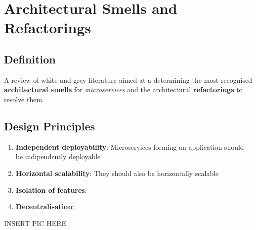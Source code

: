 \chapter{Architectural Smells and Refactorings}
\section{Definition}
A review of white and grey literature aimed at a determining the most recognised \textbf{architectural smells} for \textit{microservices} and the architectural \textbf{refactorings} to resolve them.

\section{Design Principles}
\begin{enumerate}
   \item \textbf{Independent deployability}:
   Microservices forming an application should be indipendently deployable
   \item \textbf{Horizontal scalability}:
   They should also be horizontally scalable
   \item \textbf{Isolation of features}:
   \item \textbf{Decentralisation}:
\end{enumerate}

INSERT PIC HERE



